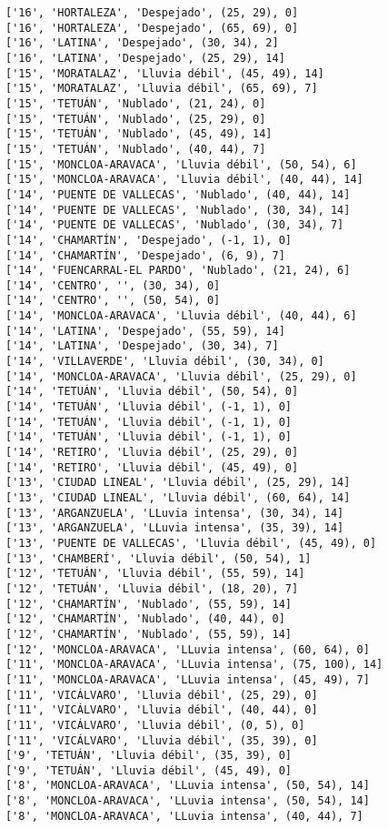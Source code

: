 \documentclass[11pt]{article}
\begin{document}
\begin{Verbatim}[commandchars=\\\{\}]
['16', 'HORTALEZA', 'Despejado', (25, 29), 0]
['16', 'HORTALEZA', 'Despejado', (65, 69), 0]
['16', 'LATINA', 'Despejado', (30, 34), 2]
['16', 'LATINA', 'Despejado', (25, 29), 14]
['15', 'MORATALAZ', 'Lluvia débil', (45, 49), 14]
['15', 'MORATALAZ', 'Lluvia débil', (65, 69), 7]
['15', 'TETUÁN', 'Nublado', (21, 24), 0]
['15', 'TETUÁN', 'Nublado', (25, 29), 0]
['15', 'TETUÁN', 'Nublado', (45, 49), 14]
['15', 'TETUÁN', 'Nublado', (40, 44), 7]
['15', 'MONCLOA-ARAVACA', 'Lluvia débil', (50, 54), 6]
['15', 'MONCLOA-ARAVACA', 'Lluvia débil', (40, 44), 14]
['14', 'PUENTE DE VALLECAS', 'Nublado', (40, 44), 14]
['14', 'PUENTE DE VALLECAS', 'Nublado', (30, 34), 14]
['14', 'PUENTE DE VALLECAS', 'Nublado', (30, 34), 7]
['14', 'CHAMARTÍN', 'Despejado', (-1, 1), 0]
['14', 'CHAMARTÍN', 'Despejado', (6, 9), 7]
['14', 'FUENCARRAL-EL PARDO', 'Nublado', (21, 24), 6]
['14', 'CENTRO', '', (30, 34), 0]
['14', 'CENTRO', '', (50, 54), 0]
['14', 'MONCLOA-ARAVACA', 'Lluvia débil', (40, 44), 6]
['14', 'LATINA', 'Despejado', (55, 59), 14]
['14', 'LATINA', 'Despejado', (30, 34), 7]
['14', 'VILLAVERDE', 'Lluvia débil', (30, 34), 0]
['14', 'MONCLOA-ARAVACA', 'Lluvia débil', (25, 29), 0]
['14', 'TETUÁN', 'Lluvia débil', (50, 54), 0]
['14', 'TETUÁN', 'Lluvia débil', (-1, 1), 0]
['14', 'TETUÁN', 'Lluvia débil', (-1, 1), 0]
['14', 'TETUÁN', 'Lluvia débil', (-1, 1), 0]
['14', 'RETIRO', 'Lluvia débil', (25, 29), 0]
['14', 'RETIRO', 'Lluvia débil', (45, 49), 0]
['13', 'CIUDAD LINEAL', 'Lluvia débil', (25, 29), 14]
['13', 'CIUDAD LINEAL', 'Lluvia débil', (60, 64), 14]
['13', 'ARGANZUELA', 'LLuvia intensa', (30, 34), 14]
['13', 'ARGANZUELA', 'LLuvia intensa', (35, 39), 14]
['13', 'PUENTE DE VALLECAS', 'Lluvia débil', (45, 49), 0]
['13', 'CHAMBERÍ', 'Lluvia débil', (50, 54), 1]
['12', 'TETUÁN', 'Lluvia débil', (55, 59), 14]
['12', 'TETUÁN', 'Lluvia débil', (18, 20), 7]
['12', 'CHAMARTÍN', 'Nublado', (55, 59), 14]
['12', 'CHAMARTÍN', 'Nublado', (40, 44), 0]
['12', 'CHAMARTÍN', 'Nublado', (55, 59), 14]
['12', 'MONCLOA-ARAVACA', 'LLuvia intensa', (60, 64), 0]
['11', 'MONCLOA-ARAVACA', 'LLuvia intensa', (75, 100), 14]
['11', 'MONCLOA-ARAVACA', 'LLuvia intensa', (45, 49), 7]
['11', 'VICÁLVARO', 'Lluvia débil', (25, 29), 0]
['11', 'VICÁLVARO', 'Lluvia débil', (40, 44), 0]
['11', 'VICÁLVARO', 'Lluvia débil', (0, 5), 0]
['11', 'VICÁLVARO', 'Lluvia débil', (35, 39), 0]
['9', 'TETUÁN', 'Lluvia débil', (35, 39), 0]
['9', 'TETUÁN', 'Lluvia débil', (45, 49), 0]
['8', 'MONCLOA-ARAVACA', 'LLuvia intensa', (50, 54), 14]
['8', 'MONCLOA-ARAVACA', 'LLuvia intensa', (50, 54), 14]
['8', 'MONCLOA-ARAVACA', 'LLuvia intensa', (40, 44), 7]

\end{Verbatim}
\end{document}
